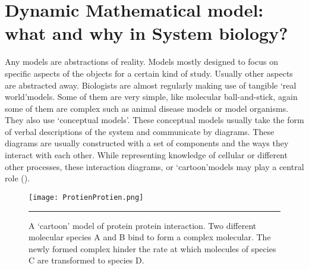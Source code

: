 \section{Dynamic Mathematical model: what and why in System biology?}
Any models are abstractions of reality. Models mostly designed to focus on specific aspects of the objects for a certain kind of study. Usually other aspects are abstracted away. Biologists are almost regularly making use of tangible \lq real world\rq  models. Some of them are very simple, like molecular ball-and-stick, again some of them are complex such as animal disease models or model organisms. They also use \lq conceptual models\rq. These conceptual models usually take the form of verbal descriptions of the system and communicate by diagrams. These diagrams are usually constructed with a set of components and the ways they interact with each other. While representing knowledge of cellular or different other processes, these interaction diagrams, or \lq cartoon\rq models may play a central role (\cite{Ingalls:2012}).

\begin{figure}%
	\centering
		\texttt{[image: ProtienProtien.png]}
		\rule{35em}{0.5pt}
	\caption[A ‘cartoon’ model of protein protein interaction.]{A ‘cartoon’ model of protein protein interaction. Two different molecular species A and B bind to form a complex molecular. The newly formed complex hinder the rate at which molecules of species C are transformed to species D.}
	\label{fig:Protein protein interaction}
\end{figure}

